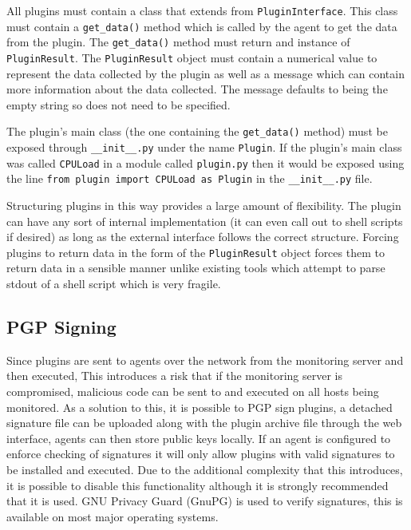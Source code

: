 \documentclass[bsc,deptreport,twoside,parskip,singlespacing,notimes]{infthesis}
\begin{document}
	All plugins must contain a class that extends from \texttt{PluginInterface}.
	This class must contain a \texttt{get\_data()} method which is called by the
	agent to get the data from the plugin.  The \texttt{get\_data()} method must
	return and instance of \texttt{PluginResult}.  The \texttt{PluginResult} object
	must contain a numerical value to represent the data collected by the plugin as
	well as a message which can contain more information about the data collected.
	The message defaults to being the empty string so does not need to be
	specified.


	The plugin's main class (the one containing the \texttt{get\_data()} method)
	must be exposed through \texttt{\_\_init\_\_.py} under the name \texttt{Plugin}.
	If the plugin's main class was called \texttt{CPULoad} in a module called
	\texttt{plugin.py} then it would be exposed using the line
	\texttt{from plugin import CPULoad as Plugin} in the \texttt{\_\_init\_\_.py}
	file.


	Structuring plugins in this way provides a large amount of flexibility.  The
	plugin can have any sort of internal implementation (it can even call out to
	shell scripts if desired) as long as the external interface follows the correct
	structure.  Forcing plugins to return data in the form of the
	\texttt{PluginResult} object forces them to return data in a sensible manner
	unlike existing tools which attempt to parse stdout of a shell script which is
	very fragile.
	
\subsection{PGP Signing}
	Since plugins are sent to agents over the network from the monitoring server 
	and then executed, This introduces a risk that if the monitoring server is
	compromised, malicious code can be sent to and executed on all hosts being
	monitored.  As a solution to this, it is possible to PGP sign plugins, a
	detached signature file can be uploaded along with the plugin archive file
	through the web interface, agents can then store public keys locally. If an
	agent is configured to enforce checking of signatures it will only allow
	plugins with valid signatures to be installed and executed.  Due to the
	additional complexity that this introduces, it is possible to disable this
	functionality although it is strongly recommended that it is used.  GNU
	Privacy Guard (GnuPG) is used to verify signatures, this is available on most
	major operating systems.
\end{document}
